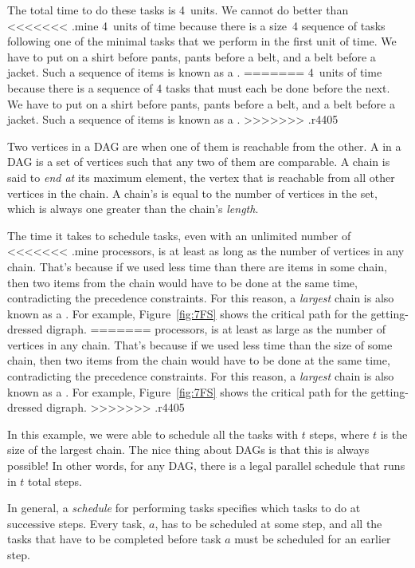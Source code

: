 The total time to do these tasks is 4~units.  We cannot do better than
<<<<<<< .mine
4~units of time because there is a size~4 sequence of tasks
following one of the minimal tasks that we perform in the first unit
of time.  We have to put on a shirt before pants, pants before a belt,
and a belt before a jacket.  Such a sequence of items is known as a
.
=======
4~units of time because there is a sequence of 4 tasks that must
each be done before the next.  We have to put on a shirt before
pants, pants before a belt, and a belt before a jacket.
Such a sequence of items is known as a .
>>>>>>> .r4405

\begin{definition}
Two vertices in a DAG are  when one of them is
reachable from the other.  A  in a DAG is a set of
vertices such that any two of them are comparable.  A chain is said to
\emph{end at} its maximum element, the vertex that
is reachable from all other vertices in the chain. A chain's
 is equal to the number of vertices in the set, which is
always one greater than the chain's \emph{length}.
\end{definition}

The time it takes to schedule tasks, even with an unlimited number of
<<<<<<< .mine
processors, is at least as long as the number of vertices in any
chain.  That's because if we used less time than there are items in some
chain, then two items from the chain would have to be done at the same
time, contradicting the precedence constraints.  For this reason, a
\emph{largest} chain is also known as a .  For
example, Figure~\ref{fig:7FS} shows the critical path for the
getting-dressed digraph.
=======
processors, is at least as large as the number of vertices in any
chain.  That's because if we used less time than the size of some
chain, then two items from the chain would have to be done at the same
time, contradicting the precedence constraints.  For this reason, a
\emph{largest} chain is also known as a .  For
example, Figure~\ref{fig:7FS} shows the critical path for the
getting-dressed digraph.
>>>>>>> .r4405

In this example, we were able to schedule all the tasks with $t$
steps, where $t$ is the size of the largest chain.  The nice thing
about DAGs is that this is always possible!  In other words, for any
DAG, there is a legal parallel schedule that runs in $t$ total
steps.

In general, a \emph{schedule} for performing tasks specifies which
tasks to do at successive steps.  Every task, $a$, has to be scheduled
at some step, and all the tasks that have to be completed before task
$a$ must be scheduled for an earlier step.

